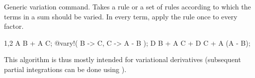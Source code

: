 
Generic variation command.  Takes a rule or a set of rules
according to which the terms in a sum should be varied. In every term,
apply the rule once to every factor.
\begin{screen}{1,2}
A B + A C;
@vary!(%
           B -> \epsilon C,
           C -> \epsilon A - \epsilon B );
\epsilon D B + A \epsilon C + \epsilon D C 
                   + A (\epsilon A - \epsilon B);
\end{screen}
This algorithm is thus mostly intended for variational derivatives
(subsequent partial integrations can be done using ).


